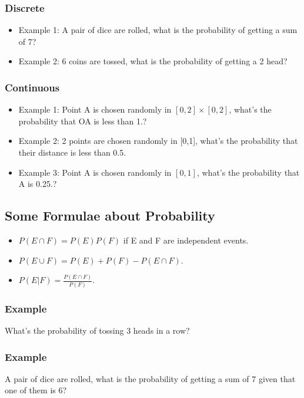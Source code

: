 \documentclass{article}
\begin{document}
\subsubsection{Discrete}
\begin{itemize}
    \item Example 1: A pair of dice are rolled, what is the probability of getting a sum of 7? \vspace{40px}
    \item Example 2: 6 coins are tossed, what is the probability of getting a 2 head?
\end{itemize}
\pagebreak

\subsubsection{Continuous}
\begin{itemize}
    \item Example 1: Point A is chosen randomly in $[0,2]\times[0,2]$, what's the probability that OA is less than 1.?\vspace{40px}
    \item Example 2: 2 points are chosen randomly in [0,1], what's the probability that their distance is less than 0.5.  \vspace{40px}
    \item Example 3: Point A is chosen randomly in $[0,1]$, what's the probability that A is 0.25.?\vspace{40px}
\end{itemize}
\subsection{Some Formulae about Probability}
\begin{itemize}
    \item  $P(E \cap F)=P(E)P(F)$ if E and F are independent events.
    \item  $P(E \cup F)=P(E)+P(F)-P(E \cap F)$.
    \item  $P(E|F)	=	\frac{P(E \cap F)}{P(F)}$.
\end{itemize}

\subsubsection{Example}
What's the probability of tossing 3 heads in a row?
\vspace{30px}
\subsubsection{Example}
A pair of dice are rolled, what is the probability of getting a sum of 7 given that one of them is 6?
\vspace{30px}
\end{document}
